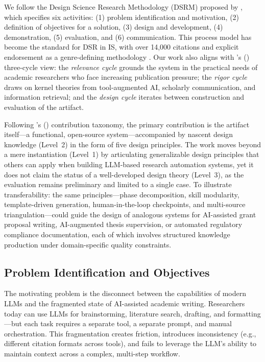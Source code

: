\documentclass{article}
\begin{document}
We follow the Design Science Research Methodology (DSRM) proposed by \citet{peffers2007dsrm}, which specifies six activities: (1) problem identification and motivation, (2) definition of objectives for a solution, (3) design and development, (4) demonstration, (5) evaluation, and (6) communication. This process model has become the standard for DSR in IS, with over 14,000 citations and explicit endorsement as a genre-defining methodology \citep{peffers2018genres}. Our work also aligns with \citeauthor{hevner2007three_cycle}'s (\citeyear{hevner2007three_cycle}) three-cycle view: the \emph{relevance cycle} grounds the system in the practical needs of academic researchers who face increasing publication pressure; the \emph{rigor cycle} draws on kernel theories from tool-augmented AI, scholarly communication, and information retrieval; and the \emph{design cycle} iterates between construction and evaluation of the artifact.

Following \citeauthor{gregor2013positioning}'s (\citeyear{gregor2013positioning}) contribution taxonomy, the primary contribution is the artifact itself---a functional, open-source system---accompanied by nascent design knowledge (Level~2) in the form of five design principles. The work moves beyond a mere instantiation (Level~1) by articulating generalizable design principles that others can apply when building LLM-based research automation systems, yet it does not claim the status of a well-developed design theory (Level~3), as the evaluation remains preliminary and limited to a single case. To illustrate transferability: the same principles---phase decomposition, skill modularity, template-driven generation, human-in-the-loop checkpoints, and multi-source triangulation---could guide the design of analogous systems for AI-assisted grant proposal writing, AI-augmented thesis supervision, or automated regulatory compliance documentation, each of which involves structured knowledge production under domain-specific quality constraints.

\subsection{Problem Identification and Objectives}

The motivating problem is the disconnect between the capabilities of modern LLMs and the fragmented state of AI-assisted academic writing. Researchers today can use LLMs for brainstorming, literature search, drafting, and formatting---but each task requires a separate tool, a separate prompt, and manual orchestration. This fragmentation creates friction, introduces inconsistency (e.g., different citation formats across tools), and fails to leverage the LLM's ability to maintain context across a complex, multi-step workflow.
\end{document}
